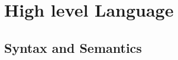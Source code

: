 \documentclass[a4paper,11pt]{article}
\begin{document}
%
%
%
%
\section{High level Language}
%
\subsection{Syntax and Semantics}
%
\end{document}
